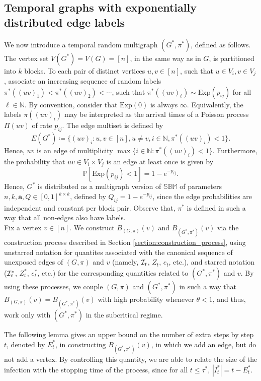 \documentclass[11pt]{article}
\numberwithin{equation}{section}
\theoremstyle{definition}
\newcommand\bB{{\mathbb B}}
\newcommand\bM{{\mathbb M}}
\newcommand\bN{{\mathbb N}}
\newcommand\bP{{\mathbb P}}
\newcommand\bS{{\mathbb S}}
\newcommand\cI{{\cal{I}}}
\begin{document}
\subsection{Temporal graphs with exponentially distributed edge labels}
\label{TESBM}
We now introduce a temporal random multigraph $(G^*,\pi^*)$, defined as follows. The vertex set $V(G^*) = V(G) = [n]$, in the same way as in $G$, is partitioned into $k$ blocks. To each pair of distinct vertices $u,v\in [n]$, such that $u \in V_i, v\in V_j$, associate an increasing sequence of random labels $\pi^*((uv)_1) < \pi^*((uv)_2) < \cdots$, such that $\pi^*((uv)_\ell) \sim \textrm{Exp}(p_{ij})$ for all $\ell \in \bN$. By convention, consider that $\textrm{Exp}(0)$ is always $\infty$. Equivalently, the labels $\pi((uv)_i)$ may be interpreted as the arrival times of a Poisson process $\Pi(uv)$ of rate $p_{ij}$. The edge multiset is defined by
$$E(G^*) \coloneqq \{(uv)_i : u,v \in [n], u\neq v, i\in\bN, \pi^*((uv)_i)<1 \}. $$
Hence, $uv$ is an edge of multiplicity $\max\{i\in \bN:\pi^*((uv)_i)<1\}$. Furthermore, the probability that $uv \in V_i \times V_j$ is an edge at least once is given by 
$$\bP[\textrm{Exp}(p_{ij})<1] = 1-e^{-p_{ij}}.$$ 
Hence, $G^*$ is distributed as a multigraph version of $\bS\bB\bM$ of parameters $n,k,\boldsymbol{a}, Q\in [0,1]^{k\times k}$, defined by $Q_{ij} = 1-e^{-p_{ij}}$, since the edge probabilities are independent and constant per block pair. Observe that, $\pi^*$ is defined in such a way that all non-edges also have labels. \\

Fix a vertex $v\in [n]$. We construct $B_{(G,\pi)}(v)$ and $B_{(G^*,\pi^*)}(v)$ via the construction process described in Section \ref{section:construction_process}, using unstarred notation for quantites associated with the canonical sequence of unexposed edges of $(G,\pi)$ and $v$ (namely, $\cI_t$, $Z_t$, $e_t$, etc.), and starred notation ($\cI^*_t$, $Z^*_t$, $e^*_t$, etc.) for the corresponding quantities related to $(G^*,\pi^*)$ and $v$. By using these processes, we couple $(G,\pi)$ and $(G^*,\pi^*)$ in such a way that $B_{(G,\pi)}(v) = B_{(G^*,\pi^*)}(v)$ with high probability whenever $\theta < 1$, and thus, work only with $(G^*,\pi^*)$ in the subcritical regime. 

The following lemma gives an upper bound on the number of extra steps by step $t$, denoted by $E^*_t$, in constructing $B_{(G^*,\pi^*)}(v)$, in which we add an edge, but do not add a vertex. By controlling this quantity, we are able to relate the size of the infection with the stopping time of the process, since for all $t\leq \tau^*$, $|I^*_t| = t - E^*_t$. 
\end{document}
